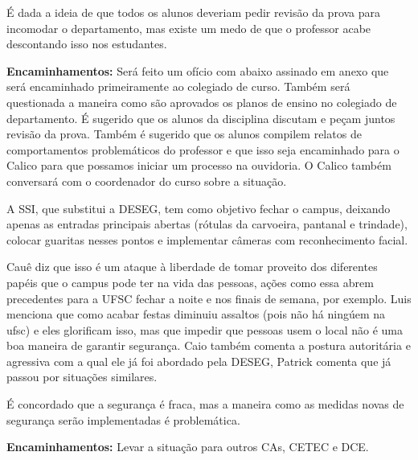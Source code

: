 \documentclass{ata-calico}
\begin{document}
É dada a ideia de que todos os alunos deveriam pedir revisão da prova para incomodar o departamento, mas existe um medo de que o professor acabe descontando isso nos estudantes.\newline

\textbf{Encaminhamentos:} Será feito um ofício com abaixo assinado em anexo que será encaminhado primeiramente ao colegiado de curso. Também será questionada a maneira como são aprovados os planos de ensino no colegiado de departamento. É sugerido que os alunos da disciplina discutam e peçam juntos revisão da prova. Também é sugerido que os alunos compilem relatos de comportamentos problemáticos do professor e que isso seja encaminhado para o Calico para que possamos iniciar um processo na ouvidoria. O Calico também conversará com o coordenador do curso sobre a situação.

A SSI, que substitui a DESEG, tem como objetivo fechar o campus, deixando apenas as entradas principais abertas (rótulas da carvoeira, pantanal e trindade), colocar guaritas nesses pontos e implementar câmeras com reconhecimento facial.

Cauê diz que isso é um ataque à liberdade de tomar proveito dos diferentes papéis que o campus pode ter na vida das pessoas, ações como essa abrem precedentes para a UFSC fechar a noite e nos finais de semana, por exemplo. Luis menciona que como acabar festas diminuiu assaltos (pois não há ningúem na ufsc) e eles glorificam isso, mas que impedir que pessoas usem o local não é uma boa maneira de garantir segurança. Caio também comenta a postura autoritária e agressiva com a qual ele já foi abordado pela DESEG, Patrick comenta que já passou por situações similares.

É concordado que a segurança é fraca, mas a maneira como as medidas novas de segurança serão implementadas é problemática.\newline

\textbf{Encaminhamentos:} Levar a situação para outros CAs, CETEC e DCE.

\end{document}
